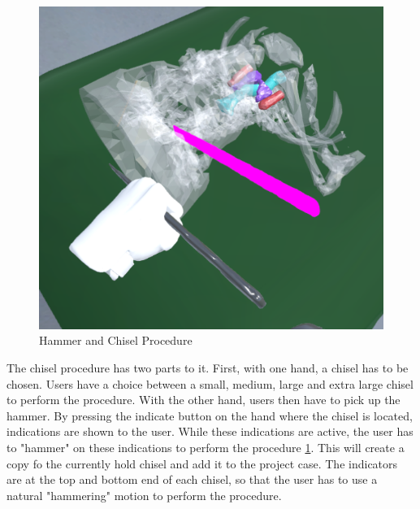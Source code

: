 \begin{figure}[ht!]
    \centering
    \includegraphics[width=\linewidth]{images/implementation/features/procedures/chisel.png}
    \caption{\label{fig::FeatureChisel}Hammer and Chisel Procedure}
\end{figure}

The chisel procedure has two parts to it.
First, with one hand, a chisel has to be chosen.
Users have a choice between a small, medium, large and extra large chisel to perform the procedure.
With the other hand, users then have to pick up the hammer.
By pressing the indicate button on the hand where the chisel is located, indications are shown to the user.
While these indications are active, the user has to "hammer" on these indications to perform the procedure \ref{fig::FeatureChisel}.
This will create a copy fo the currently hold chisel and add it to the project case.
The indicators are at the top and bottom end of each chisel, so that the user has to use a natural "hammering" motion to perform the procedure.